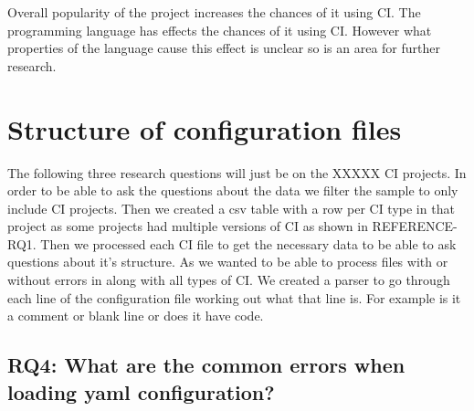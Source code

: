 \documentclass[twoside,12pt,titlepage,a4paper]{article}
\begin{document}
Overall popularity of the project increases the chances of it using CI. The programming language has effects the chances of it using CI. However what properties of the language cause this effect is unclear so is an area for further research.


 
\pagebreak
\section{Structure of configuration files}

The following three research questions will just be on the XXXXX CI projects. In order to be able to ask the questions about the data we filter the sample to only include CI projects. Then we created a csv table with a row per CI type in that project as some projects had multiple versions of CI as shown in REFERENCE-RQ1. Then we processed each CI file to get the necessary data to be able to ask questions about it's structure. As we wanted to be able to process files with or without errors in along with all types of CI. We created a parser to go through each line of the configuration file working out what that line is. For example is it a comment or blank line or does it have code. 


\vspace*{-0.05in}
\subsection{\textbf{RQ4}: What are the common errors when loading yaml configuration?}
\label{section:RQ4}
\vspace*{-0.05in}
\end{document}

